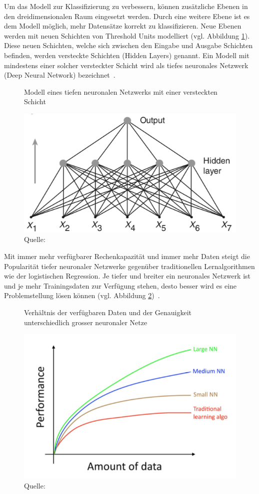 Um das Modell zur Klassifizierung zu verbessern, können zusätzliche Ebenen in den dreidimensionalen Raum eingesetzt werden. Durch eine weitere Ebene ist es dem Modell möglich, mehr Datensätze korrekt zu klassifizieren. Neue Ebenen werden mit neuen Schichten von Threshold Units modelliert (vgl. Abbildung \ref{krogh:c}). Diese neuen Schichten, welche sich zwischen den Eingabe und Ausgabe Schichten befinden, werden versteckte Schichten (Hidden Layers) genannt. Ein Modell mit mindestens einer solcher versteckter Schicht wird als tiefes neuronales Netzwerk (Deep Neural Network) bezeichnet~\autocite{Krogh2008}.

\begin{figure}[h!]
    \captionsetup{width=.9\linewidth}
    \caption{Modell eines tiefen neuronalen Netzwerks mit einer versteckten Schicht}
    \label{krogh:c}
    \centering
    \includegraphics[width=0.4\linewidth]{graphics/krogh/krogh_deep-network.png}
    \caption*{Quelle: \textcite{Krogh2008}}
\end{figure}

Mit immer mehr verfügbarer Rechenkapazität und immer mehr Daten steigt die Popularität tiefer neuronaler Netzwerke gegenüber traditionellen Lernalgorithmen wie der logistischen Regression. Je tiefer und breiter ein neuronales Netzwerk ist und je mehr Trainingsdaten zur Verfügung stehen, desto besser wird es eine Problemstellung lösen können (vgl. Abbildung \ref{scale-drives-ml-progress})~\autocite{MLYearning}.

\begin{figure}[h!]
    \captionsetup{width=.9\linewidth}
    \caption{Verhältnis der verfügbaren Daten und der Genauigkeit unterschiedlich grosser neuronaler Netze}
    \label{scale-drives-ml-progress}
    \centering
    \includegraphics[width=0.4\linewidth]{graphics/scale-drives-ml-progress.png}
    \caption*{Quelle: \textcite{MLYearning}}
\end{figure}

